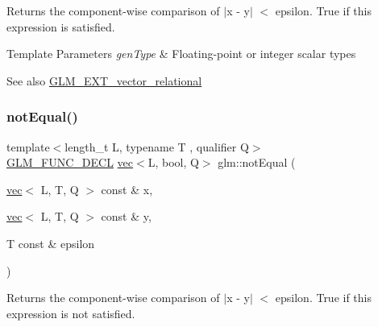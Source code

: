 Returns the component-\/wise comparison of $\vert$x -\/ y$\vert$ $<$ epsilon. True if this expression is satisfied.


\begin{DoxyTemplParams}{Template Parameters}
{\em gen\+Type} & Floating-\/point or integer scalar types\\
\hline
\end{DoxyTemplParams}
\begin{DoxySeeAlso}{See also}
\hyperlink{group__ext__vector__relational}{G\+L\+M\+\_\+\+E\+X\+T\+\_\+vector\+\_\+relational} 
\end{DoxySeeAlso}
\mbox{\label{group__ext__vector__relational_ga59a03a51402b6e1ce80f9a3b436f17bd}} 
\subsubsection{\texorpdfstring{not\+Equal()}{notEqual()}\hspace{0.1cm}{\footnotesize\ttfamily [1/3]}}
{\footnotesize\ttfamily template$<$length\+\_\+t L, typename T , qualifier Q$>$ \\
\hyperlink{setup_8hpp_ab2d052de21a70539923e9bcbf6e83a51}{G\+L\+M\+\_\+\+F\+U\+N\+C\+\_\+\+D\+E\+CL} \hyperlink{structglm_1_1vec}{vec}$<$L, bool, Q$>$ glm\+::not\+Equal (\begin{DoxyParamCaption}\item[{\hyperlink{structglm_1_1vec}{vec}$<$ L, T, Q $>$ const \&}]{x,  }\item[{\hyperlink{structglm_1_1vec}{vec}$<$ L, T, Q $>$ const \&}]{y,  }\item[{T const \&}]{epsilon }\end{DoxyParamCaption})}

Returns the component-\/wise comparison of $\vert$x -\/ y$\vert$ $<$ epsilon. True if this expression is not satisfied.


